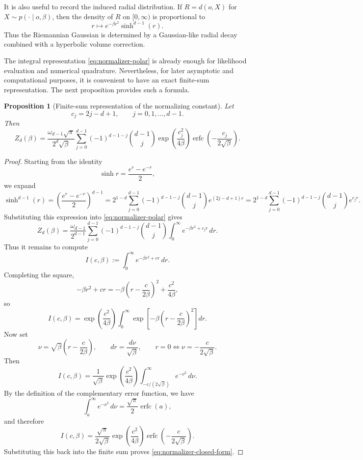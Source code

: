 \documentclass[11pt]{article}
\newtheorem{proposition}[theorem]{Proposition}
\begin{document}
It is also useful to record the induced radial distribution. If \(R=d(o,X)\) for \(X\sim p(\cdot\mid o,\beta)\), then the density of \(R\) on \([0,\infty)\) is proportional to
\begin{equation}\label{eq:radial-density}
r\longmapsto e^{-\beta r^2}\sinh^{d-1}(r).
\end{equation}
Thus the Riemannian Gaussian is determined by a Gaussian-like radial decay combined with a hyperbolic volume correction.

The integral representation \eqref{eq:normalizer-polar} is already enough for likelihood evaluation and numerical quadrature. Nevertheless, for later asymptotic and computational purposes, it is convenient to have an exact finite-sum representation. The next proposition provides such a formula.

\begin{proposition}[Finite-sum representation of the normalizing constant]\label{prop:normalizer-closed-form}
Let
\begin{equation}\label{eq:cj-def}
c_j=2j-d+1,
\qquad j=0,1,\ldots,d-1.
\end{equation}
Then
\begin{equation}\label{eq:normalizer-closed-form}
Z_d(\beta)
=
\frac{\omega_{d-1}\sqrt{\pi}}{2^d\sqrt{\beta}}
\sum_{j=0}^{d-1}
(-1)^{d-1-j}\binom{d-1}{j}
\exp\!\left(\frac{c_j^2}{4\beta}\right)
\operatorname{erfc}\!\left(-\frac{c_j}{2\sqrt{\beta}}\right).
\end{equation}
\end{proposition}

\begin{proof}
Starting from the identity
\[
\sinh r=\frac{e^r-e^{-r}}{2},
\]
we expand
\[
\sinh^{d-1}(r)
=
\left(\frac{e^r-e^{-r}}{2}\right)^{d-1}
=
2^{1-d}\sum_{j=0}^{d-1}
(-1)^{d-1-j}\binom{d-1}{j}e^{(2j-d+1)r}
=
2^{1-d}\sum_{j=0}^{d-1}
(-1)^{d-1-j}\binom{d-1}{j}e^{c_j r}.
\]
Substituting this expression into \eqref{eq:normalizer-polar} gives
\[
Z_d(\beta)
=
\frac{\omega_{d-1}}{2^{d-1}}
\sum_{j=0}^{d-1}
(-1)^{d-1-j}\binom{d-1}{j}
\int_0^\infty e^{-\beta r^2+c_j r}\,dr.
\]
Thus it remains to compute
\[
I(c,\beta):=\int_0^\infty e^{-\beta r^2+cr}\,dr.
\]
Completing the square,
\[
-\beta r^2+cr
=
-\beta\left(r-\frac{c}{2\beta}\right)^2+\frac{c^2}{4\beta},
\]
so
\[
I(c,\beta)
=
\exp\!\left(\frac{c^2}{4\beta}\right)
\int_0^\infty
\exp\!\left[-\beta\left(r-\frac{c}{2\beta}\right)^2\right]dr.
\]
Now set
\[
\nu=\sqrt{\beta}\left(r-\frac{c}{2\beta}\right),
\qquad
dr=\frac{d\nu}{\sqrt{\beta}},
\qquad
r=0\iff \nu=-\frac{c}{2\sqrt{\beta}}.
\]
Then
\[
I(c,\beta)
=
\frac{1}{\sqrt{\beta}}
\exp\!\left(\frac{c^2}{4\beta}\right)
\int_{-c/(2\sqrt{\beta})}^{\infty} e^{-\nu^2}\,d\nu.
\]
By the definition of the complementary error function, we have
\[
\int_a^\infty e^{-\nu^2}\,d\nu
=
\frac{\sqrt{\pi}}{2}\operatorname{erfc}(a),
\]
and therefore
\[
I(c,\beta)
=
\frac{\sqrt{\pi}}{2\sqrt{\beta}}
\exp\!\left(\frac{c^2}{4\beta}\right)
\operatorname{erfc}\!\left(-\frac{c}{2\sqrt{\beta}}\right).
\]
Substituting this back into the finite sum proves \eqref{eq:normalizer-closed-form}.
\end{proof}
\end{document}
